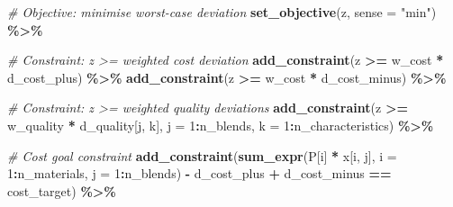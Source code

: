 \documentclass[
]{article}
\newenvironment{Shaded}{\begin{snugshade}}{\end{snugshade}}
\newcommand{\AttributeTok}[1]{\textcolor[rgb]{0.13,0.29,0.53}{#1}}
\newcommand{\CommentTok}[1]{\textcolor[rgb]{0.56,0.35,0.01}{\textit{#1}}}
\newcommand{\DecValTok}[1]{\textcolor[rgb]{0.00,0.00,0.81}{#1}}
\newcommand{\FunctionTok}[1]{\textcolor[rgb]{0.13,0.29,0.53}{\textbf{#1}}}
\newcommand{\NormalTok}[1]{#1}
\newcommand{\SpecialCharTok}[1]{\textcolor[rgb]{0.81,0.36,0.00}{\textbf{#1}}}
\newcommand{\StringTok}[1]{\textcolor[rgb]{0.31,0.60,0.02}{#1}}
\begin{document}
\begin{Shaded}
\begin{Highlighting}[]
  \CommentTok{\# Objective: minimise worst{-}case deviation}
  \FunctionTok{set\_objective}\NormalTok{(z, }\AttributeTok{sense =} \StringTok{"min"}\NormalTok{) }\SpecialCharTok{\%\textgreater{}\%}
  
  \CommentTok{\# Constraint: z \textgreater{}= weighted cost deviation}
  \FunctionTok{add\_constraint}\NormalTok{(z }\SpecialCharTok{\textgreater{}=}\NormalTok{ w\_cost }\SpecialCharTok{*}\NormalTok{ d\_cost\_plus) }\SpecialCharTok{\%\textgreater{}\%}
  \FunctionTok{add\_constraint}\NormalTok{(z }\SpecialCharTok{\textgreater{}=}\NormalTok{ w\_cost }\SpecialCharTok{*}\NormalTok{ d\_cost\_minus) }\SpecialCharTok{\%\textgreater{}\%}
  
  \CommentTok{\# Constraint: z \textgreater{}= weighted quality deviations}
  \FunctionTok{add\_constraint}\NormalTok{(z }\SpecialCharTok{\textgreater{}=}\NormalTok{ w\_quality }\SpecialCharTok{*}\NormalTok{ d\_quality[j, k], }
                 \AttributeTok{j =} \DecValTok{1}\SpecialCharTok{:}\NormalTok{n\_blends, }\AttributeTok{k =} \DecValTok{1}\SpecialCharTok{:}\NormalTok{n\_characteristics) }\SpecialCharTok{\%\textgreater{}\%}
  
  \CommentTok{\# Cost goal constraint}
  \FunctionTok{add\_constraint}\NormalTok{(}\FunctionTok{sum\_expr}\NormalTok{(P[i] }\SpecialCharTok{*}\NormalTok{ x[i, j], }\AttributeTok{i =} \DecValTok{1}\SpecialCharTok{:}\NormalTok{n\_materials, }\AttributeTok{j =} \DecValTok{1}\SpecialCharTok{:}\NormalTok{n\_blends) }\SpecialCharTok{{-}} 
\NormalTok{                 d\_cost\_plus }\SpecialCharTok{+}\NormalTok{ d\_cost\_minus }\SpecialCharTok{==}\NormalTok{ cost\_target) }\SpecialCharTok{\%\textgreater{}\%}
  

\end{Highlighting}
\end{Shaded}
\end{document}
